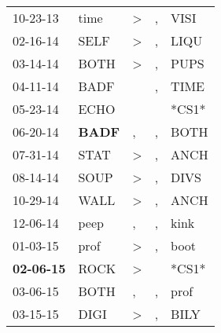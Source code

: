 \begin{supertabular}{p{0.07\textwidth}p{0.06\textwidth}p{0.02\textwidth}p{0.02\textwidth}p{0.06\textwidth}}
          10-23-13\textsuperscript{} &           time\textsuperscript{} &     \textgreater &                , &           VISI\textsuperscript{} \\
          02-16-14\textsuperscript{} &           SELF\textsuperscript{} &     \textgreater &                , &           LIQU\textsuperscript{} \\
          03-14-14\textsuperscript{} &           BOTH\textsuperscript{} &     \textgreater &                , &           PUPS\textsuperscript{} \\
          04-11-14\textsuperscript{} &           BADF\textsuperscript{} &                  &                , &           TIME\textsuperscript{} \\
          05-23-14\textsuperscript{} &           ECHO\textsuperscript{} &                  &                  &                            *CS1* \\
          06-20-14\textsuperscript{} &  \textbf{BADF\textsuperscript{}} &                , &                , &           BOTH\textsuperscript{} \\
          07-31-14\textsuperscript{} &           STAT\textsuperscript{} &     \textgreater &                , &           ANCH\textsuperscript{} \\
          08-14-14\textsuperscript{} &           SOUP\textsuperscript{} &     \textgreater &                , &           DIVS\textsuperscript{} \\
          10-29-14\textsuperscript{} &           WALL\textsuperscript{} &     \textgreater &                , &           ANCH\textsuperscript{} \\
          12-06-14\textsuperscript{} &           peep\textsuperscript{} &                , &                , &           kink\textsuperscript{} \\
          01-03-15\textsuperscript{} &           prof\textsuperscript{} &     \textgreater &                , &           boot\textsuperscript{} \\
 \textbf{02-06-15\textsuperscript{}} &           ROCK\textsuperscript{} &     \textgreater &                  &                            *CS1* \\
          03-06-15\textsuperscript{} &           BOTH\textsuperscript{} &                , &                , &           prof\textsuperscript{} \\
          03-15-15\textsuperscript{} &           DIGI\textsuperscript{} &     \textgreater &                , &           BILY\textsuperscript{} \\

\end{supertabular}
